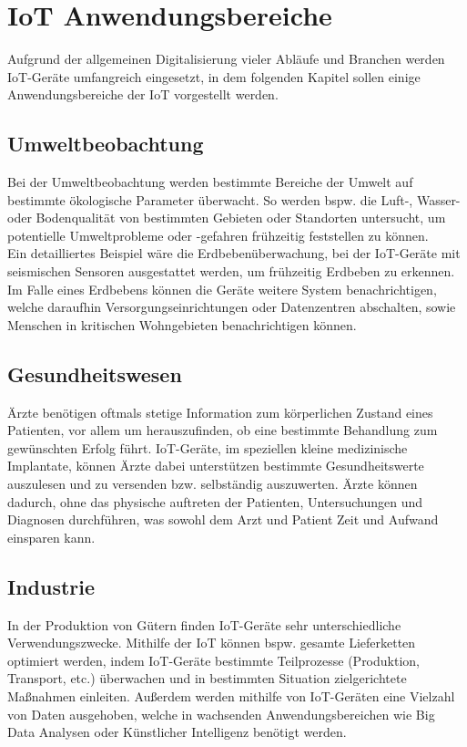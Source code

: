 \section{IoT Anwendungsbereiche}
Aufgrund der allgemeinen Digitalisierung vieler Abläufe und Branchen werden IoT-Geräte umfangreich eingesetzt,
in dem folgenden Kapitel sollen einige Anwendungsbereiche der IoT vorgestellt werden. 

\subsection{Umweltbeobachtung}
Bei der Umweltbeobachtung werden bestimmte Bereiche der Umwelt auf bestimmte ökologische Parameter überwacht. 
So werden bspw. die Luft-, Wasser- oder Bodenqualität von bestimmten Gebieten oder Standorten 
untersucht, um potentielle Umweltprobleme oder -gefahren frühzeitig feststellen zu können. \\

Ein detailliertes Beispiel wäre die Erdbebenüberwachung, bei der IoT-Geräte mit seismischen Sensoren
ausgestattet werden, um frühzeitig Erdbeben zu erkennen. Im Falle eines Erdbebens können die Geräte
weitere System benachrichtigen, welche daraufhin Versorgungseinrichtungen oder  Datenzentren
abschalten, sowie Menschen in kritischen Wohngebieten benachrichtigen können.

\subsection{Gesundheitswesen}
Ärzte benötigen oftmals stetige Information zum körperlichen Zustand eines Patienten, vor allem um
herauszufinden, ob eine bestimmte Behandlung zum gewünschten Erfolg führt. IoT-Geräte, im speziellen
kleine medizinische Implantate, können Ärzte dabei unterstützen bestimmte Gesundheitswerte auszulesen und 
zu versenden bzw. selbständig auszuwerten. Ärzte können dadurch, ohne das physische auftreten der Patienten,
Untersuchungen und Diagnosen durchführen, was sowohl dem Arzt und Patient Zeit und Aufwand einsparen kann.

\subsection{Industrie}
In der Produktion von Gütern finden IoT-Geräte sehr unterschiedliche Verwendungszwecke. Mithilfe der IoT können
bspw. gesamte Lieferketten optimiert werden, indem IoT-Geräte bestimmte Teilprozesse (Produktion, Transport, etc.)
überwachen und in bestimmten Situation zielgerichtete Maßnahmen einleiten. Außerdem werden mithilfe von IoT-Geräten eine 
Vielzahl von Daten ausgehoben, welche in wachsenden Anwendungsbereichen wie Big Data Analysen oder Künstlicher Intelligenz 
benötigt werden.

